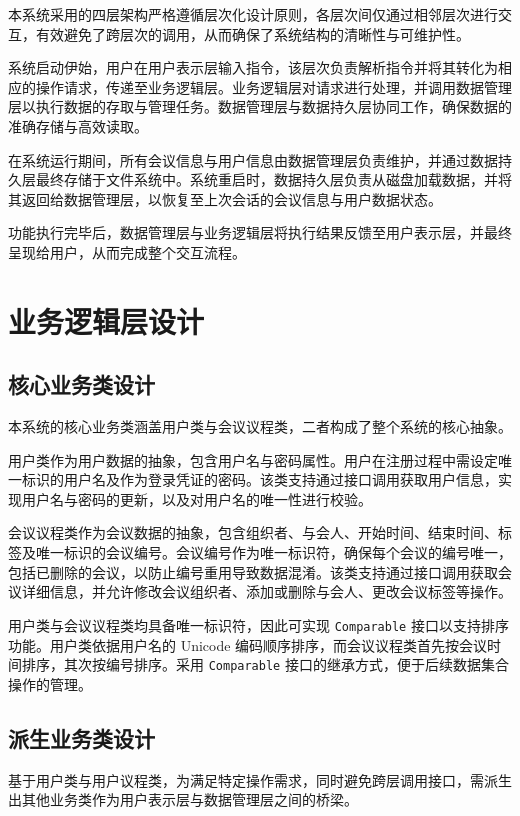 \documentclass[a4paper, twoside, utf8]{ctexart}
\begin{document}
    本系统采用的四层架构严格遵循层次化设计原则，各层次间仅通过相邻层次进行交互，有效避免了跨层次的调用，从而确保了系统结构的清晰性与可维护性。
    
    系统启动伊始，用户在用户表示层输入指令，该层次负责解析指令并将其转化为相应的操作请求，传递至业务逻辑层。业务逻辑层对请求进行处理，并调用数据管理层以执行数据的存取与管理任务。数据管理层与数据持久层协同工作，确保数据的准确存储与高效读取。
    
    在系统运行期间，所有会议信息与用户信息由数据管理层负责维护，并通过数据持久层最终存储于文件系统中。系统重启时，数据持久层负责从磁盘加载数据，并将其返回给数据管理层，以恢复至上次会话的会议信息与用户数据状态。
    
    功能执行完毕后，数据管理层与业务逻辑层将执行结果反馈至用户表示层，并最终呈现给用户，从而完成整个交互流程。
    
    \section{业务逻辑层设计}

    \subsection{核心业务类设计}

    本系统的核心业务类涵盖用户类与会议议程类，二者构成了整个系统的核心抽象。

    用户类作为用户数据的抽象，包含用户名与密码属性。用户在注册过程中需设定唯一标识的用户名及作为登录凭证的密码。该类支持通过接口调用获取用户信息，实现用户名与密码的更新，以及对用户名的唯一性进行校验。

    会议议程类作为会议数据的抽象，包含组织者、与会人、开始时间、结束时间、标签及唯一标识的会议编号。会议编号作为唯一标识符，确保每个会议的编号唯一，包括已删除的会议，以防止编号重用导致数据混淆。该类支持通过接口调用获取会议详细信息，并允许修改会议组织者、添加或删除与会人、更改会议标签等操作。

    用户类与会议议程类均具备唯一标识符，因此可实现 \verb|Comparable| 接口以支持排序功能。用户类依据用户名的 Unicode 编码顺序排序，而会议议程类首先按会议时间排序，其次按编号排序。采用 \verb|Comparable| 接口的继承方式，便于后续数据集合操作的管理。

    \subsection{派生业务类设计}
    
    基于用户类与用户议程类，为满足特定操作需求，同时避免跨层调用接口，需派生出其他业务类作为用户表示层与数据管理层之间的桥梁。
    
\end{document}
